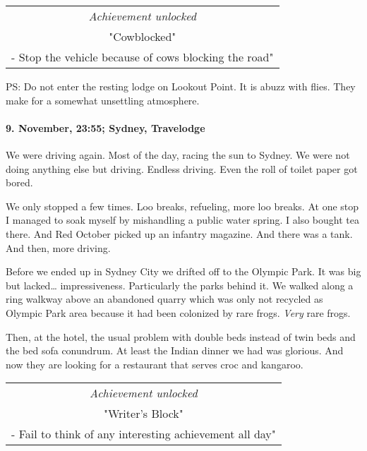 \begin{center}
\begin{tabular}{||c||}
\emph{Achievement unlocked}\\
"Cowblocked"\\
\multicolumn{1}{||p{0.8\textwidth}||}{\footnotesize - Stop the vehicle because of cows blocking the road"} \\
\end{tabular}
\end{center}

PS: Do not enter the resting lodge on Lookout Point.
It is abuzz with flies.
They make for a somewhat unsettling atmosphere.

\paragraph{9. November, 23:55; Sydney, Travelodge}
We were driving again.
Most of the day, racing the sun to Sydney.
We were not doing anything else but driving.
Endless driving.
Even the roll of toilet paper got bored.

We only stopped a few times.
Loo breaks, refueling, more loo breaks.
At one stop I managed to soak myself by mishandling a public water spring.
I also bought tea there.
And Red October picked up an infantry magazine.
And there was a tank.
And then, more driving.

Before we ended up in Sydney City we drifted off to the Olympic Park.
It was big but lacked\ldots{} impressiveness.
Particularly the parks behind it.
We walked along a ring walkway above an abandoned quarry which was only not recycled as Olympic Park area because it had been colonized by rare frogs.
\emph{Very} rare frogs.

Then, at the hotel, the usual problem with double beds instead of twin beds and the bed sofa conundrum.
At least the Indian dinner we had was glorious.
And now they are looking for a restaurant that serves croc and kangaroo.

\begin{center}
\begin{tabular}{||c||}
\emph{Achievement unlocked}\\
"Writer's Block"\\
\multicolumn{1}{||p{0.8\textwidth}||}{\footnotesize - Fail to think of any interesting achievement all day"} \\
\end{tabular}
\end{center}

